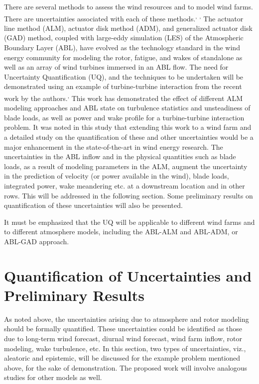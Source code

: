 \documentclass[]{aiaa-tc}%
\begin{document}
There are several methods to assess the wind resources and to model wind farms. There are uncertainties associated with each of these methods.\cite{lackner:aiaa2007}\textsuperscript{, } \cite{lackner:asme2008}\textsuperscript{, } \cite{kwon:ae2010} The actuator line method (ALM), actuator disk method (ADM), and generalized actuator disk (GAD) method, coupled with large-eddy simulation (LES) of the Atmospheric Boundary Layer (ABL), have evolved as the technology standard in the wind energy community for modeling the rotor, fatigue, and wakes of standalone as well as an array of wind turbines immersed in an ABL flow. The need for Uncertainty Quantification (UQ), and the techniques to be undertaken will be demonstrated using an example of turbine-turbine interaction from the recent work by the authors.\cite{jha:aiaa2014}\textsuperscript{, }\cite{jha:jsee2014} This work has demonstrated the effect of different ALM modeling approaches and ABL state on turbulence statistics and unsteadiness of blade loads, as well as power and wake profile for a turbine-turbine interaction problem. It was noted in this study that extending this work to a wind farm and a detailed study on the quantification of these and other uncertainties would be a major enhancement in the state-of-the-art in wind energy research. The uncertainties in the ABL inflow and in the physical quantities such as blade loads, as a result of modeling parameters in the ALM, augment the uncertainty in the prediction of velocity (or power available in the wind), blade loads, integrated power, wake meandering etc. at a downstream location and in other rows. This will be addressed in the following section. Some preliminary results on quantification of these uncertainties will also be presented.

It must be emphasized that the UQ will be applicable to different wind farms and to different atmosphere models, including the ABL-ALM and ABL-ADM, or ABL-GAD approach.

\section{Quantification of Uncertainties and Preliminary Results}

As noted above, the uncertainties arising due to atmosphere and rotor modeling should be formally quantified. These uncertainties could be identified as those due to long-term wind forecast, diurnal wind forecast, wind farm inflow, rotor modeling, wake turbulence, etc. In this section, two types of uncertainties, viz., aleatoric and epistemic, will be discussed for the example problem mentioned above, for the sake of demonstration. The proposed work will involve analogous studies for other models as well. 
\end{document}
